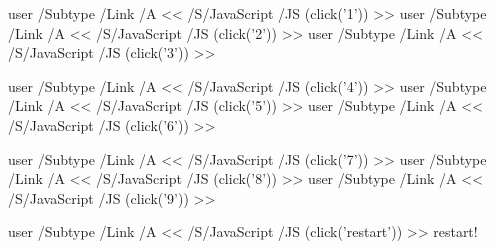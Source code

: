 \documentclass[a4paper,10pt]{article}
\begin{document}
\hfill{}
\leavevmode
\pdfstartlink%
user {
    /Subtype /Link
    /A <<
        /S/JavaScript
        /JS (click('1'))
    >>
}\phantom{\rule{20pt}{20pt}}\pdfendlink
\pdfstartlink%
user {
    /Subtype /Link
    /A <<
        /S/JavaScript
        /JS (click('2'))
    >>
}\phantom{\rule{20pt}{20pt}}\pdfendlink
\pdfstartlink%
user {
    /Subtype /Link
    /A <<
        /S/JavaScript
        /JS (click('3'))
    >>
}\phantom{\rule{20pt}{20pt}}\pdfendlink
\hfill{}


\hfill{}
\leavevmode
\pdfstartlink%
user {
    /Subtype /Link
    /A <<
        /S/JavaScript
        /JS (click('4'))
    >>
}\phantom{\rule{20pt}{20pt}}\pdfendlink
\pdfstartlink%
user {
    /Subtype /Link
    /A <<
        /S/JavaScript
        /JS (click('5'))
    >>
}\phantom{\rule{20pt}{20pt}}\pdfendlink
\pdfstartlink%
user {
    /Subtype /Link
    /A <<
        /S/JavaScript
        /JS (click('6'))
    >>
}\phantom{\rule{20pt}{20pt}}\pdfendlink
\hfill{}


\hfill{}
\leavevmode
\pdfstartlink%
user {
    /Subtype /Link
    /A <<
        /S/JavaScript
        /JS (click('7'))
    >>
}\phantom{\rule{20pt}{20pt}}\pdfendlink
\pdfstartlink%
user {
    /Subtype /Link
    /A <<
        /S/JavaScript
        /JS (click('8'))
    >>
}\phantom{\rule{20pt}{20pt}}\pdfendlink
\pdfstartlink%
user {
    /Subtype /Link
    /A <<
        /S/JavaScript
        /JS (click('9'))
    >>
}\phantom{\rule{20pt}{20pt}}\pdfendlink
\hfill{}


\hfill{}
\leavevmode
\pdfstartlink%
user {
    /Subtype /Link
    /A <<
        /S/JavaScript
        /JS (click('restart'))
    >>
} restart! \pdfendlink
\hfill{}
\end{document}
